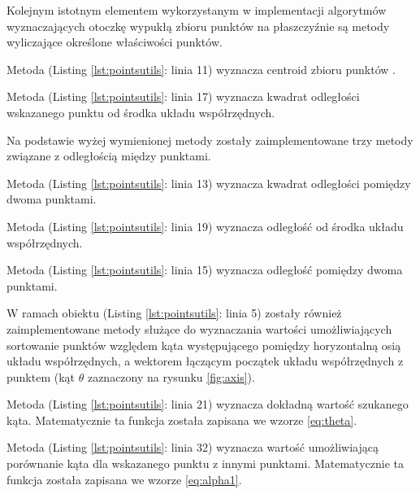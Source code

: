    		
   		\listingsource
   		Kolejnym istotnym elementem wykorzystanym w implementacji algorytmów wyznaczających otoczkę wypukłą zbioru punktów na płaszczyźnie są metody wyliczające określone właściwości punktów.
   		
   		Metoda  (Listing \ref{lst:pointsutils}: linia 11) wyznacza centroid zbioru punktów .
   		
   		Metoda  (Listing \ref{lst:pointsutils}: linia 17) wyznacza kwadrat odległości wskazanego punktu od środka układu współrzędnych.
   		
   		Na podstawie wyżej wymienionej metody zostały zaimplementowane trzy metody związane z odległością między punktami.
   		
   		Metoda  (Listing \ref{lst:pointsutils}: linia 13) wyznacza kwadrat odległości pomiędzy dwoma punktami.
   		
   		Metoda  (Listing \ref{lst:pointsutils}: linia 19) wyznacza odległość od środka układu współrzędnych.
   		
   		Metoda  (Listing \ref{lst:pointsutils}: linia 15) wyznacza odległość pomiędzy dwoma punktami.

		W ramach obiektu  (Listing \ref{lst:pointsutils}: linia 5) zostały również zaimplementowane metody służące do wyznaczania wartości umożliwiających sortowanie punktów względem kąta występującego pomiędzy horyzontalną osią układu współrzędnych, a wektorem łączącym początek układu współrzędnych z punktem (kąt $\theta$ zaznaczony na rysunku \ref{fig:axis}).
		
		Metoda  (Listing \ref{lst:pointsutils}: linia 21) wyznacza dokładną wartość szukanego kąta. Matematycznie ta funkcja została zapisana we wzorze \ref{eq:theta}.
		
		Metoda  (Listing \ref{lst:pointsutils}: linia 32) wyznacza wartość umożliwiającą porównanie kąta dla wskazanego punktu z innymi punktami. Matematycznie ta funkcja została zapisana we wzorze \ref{eq:alpha1}.
   		
   		
   		\listingsource
   		\newpage
   		
